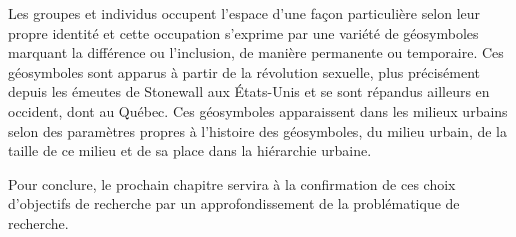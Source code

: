Les groupes et individus \lgbt{} occupent l'espace d'une façon particulière selon leur propre identité et cette occupation s'exprime par une variété de géosymboles marquant la différence ou l'inclusion, de manière permanente ou temporaire.
Ces géosymboles sont apparus à partir de la révolution sexuelle, plus précisément depuis les émeutes de Stonewall aux États-Unis et se sont répandus ailleurs en occident, dont au Québec.
Ces géosymboles apparaissent dans les milieux urbains selon des paramètres propres à l'histoire des géosymboles, du milieu urbain, de la taille de ce milieu et de sa place dans la hiérarchie urbaine.

Pour conclure, le prochain chapitre servira à la confirmation de ces choix d'objectifs de recherche par un approfondissement de la problématique de recherche.


